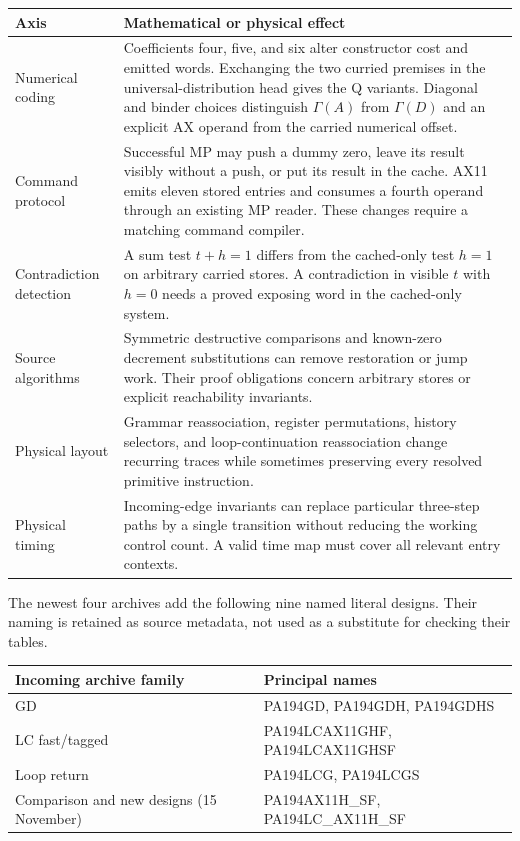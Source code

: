 \documentclass[11pt,a4paper]{article}
\theoremstyle{definition}
\begin{document}
\begin{longtable}{p{}p{}}
\toprule
Axis & Mathematical or physical effect\\
\midrule\endhead
Numerical coding & Coefficients four, five, and six alter constructor
cost and emitted words. Exchanging the two curried premises in the
universal-distribution head gives the Q variants. Diagonal and binder
choices distinguish $\Gamma(A)$ from $\Gamma(D)$ and an explicit AX
operand from the carried numerical offset.\\
Command protocol & Successful MP may push a dummy zero, leave its result
visibly without a push, or put its result in the cache. AX11 emits eleven
stored entries and consumes a fourth operand through an existing MP
reader. These changes require a matching command compiler.\\
Contradiction detection & A sum test $t+h=1$ differs from the cached-only
test $h=1$ on arbitrary carried stores. A contradiction in visible $t$
with $h=0$ needs a proved exposing word in the cached-only system.\\
Source algorithms & Symmetric destructive comparisons and known-zero
decrement substitutions can remove restoration or jump work. Their
proof obligations concern arbitrary stores or explicit reachability
invariants.\\
Physical layout & Grammar reassociation, register permutations, history
selectors, and loop-continuation reassociation change recurring traces
while sometimes preserving every resolved primitive instruction.\\
Physical timing & Incoming-edge invariants can replace particular
three-step paths by a single transition without reducing the working
control count. A valid time map must cover all relevant entry contexts.\\
\bottomrule
\end{longtable}

The newest four archives add the following nine named literal designs.
Their naming is retained as source metadata, not used as a substitute
for checking their tables.
\begin{center}\small
\begin{tabular}{p{}p{}}
\toprule
Incoming archive family & Principal names\\
\midrule
GD & PA194GD, PA194GDH, PA194GDHS\\
LC fast/tagged & PA194LCAX11GHF, PA194LCAX11GHSF\\
Loop return & PA194LCG, PA194LCGS\\
Comparison and new designs (15 November) & PA194AX11H\_SF,
PA194LC\_AX11H\_SF\\
\bottomrule
\end{tabular}
\end{center}
\end{document}
